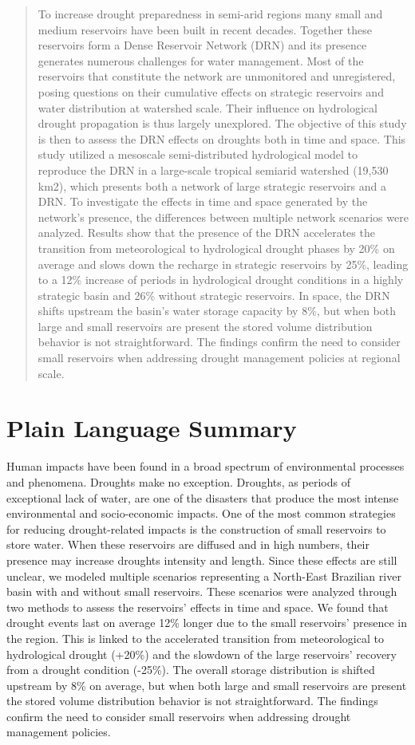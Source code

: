 \documentclass[draft]{agujournal2019}
\begin{document}
\begin{abstract}
To increase drought preparedness in semi-arid regions many small and medium reservoirs have been built in recent decades. Together these reservoirs form a Dense Reservoir Network (DRN) and its presence generates numerous challenges for water management. Most of the reservoirs that constitute the network are unmonitored and unregistered, posing questions on their cumulative effects on strategic reservoirs and water distribution at watershed scale. Their influence on hydrological drought propagation is thus largely unexplored. The objective of this study is then to assess the DRN effects on droughts both in time and space. This study utilized a mesoscale semi-distributed hydrological model to reproduce the DRN in a large-scale tropical semiarid watershed (19,530 km2), which presents both a network of large strategic reservoirs and a DRN. To investigate the effects in time and space generated by the network’s presence, the differences between multiple network scenarios were analyzed. Results show that the presence of the DRN accelerates the transition from meteorological to hydrological drought phases by 20\% on average and slows down the recharge in strategic reservoirs by 25\%, leading to a 12\% increase of periods in hydrological drought conditions in a highly strategic basin and 26\% without strategic reservoirs. In space, the DRN shifts upstream the basin’s water storage capacity by 8\%, but when both large and small reservoirs are present the stored volume distribution behavior is not straightforward. The findings confirm the need to consider small reservoirs when addressing drought management policies at regional scale.
\end{abstract}

\section*{Plain Language Summary}
Human impacts have been found in a broad spectrum of environmental processes and phenomena. Droughts make no exception. Droughts, as periods of exceptional lack of water, are one of the disasters that produce the most intense environmental and socio-economic impacts. One of the most common strategies for reducing drought-related impacts is the construction of small reservoirs to store water. When these reservoirs are diffused and in high numbers, their presence may increase droughts intensity and length. Since these effects are still unclear, we modeled multiple scenarios representing a North-East Brazilian river basin with and without small reservoirs. These scenarios were analyzed through two methods to assess the reservoirs’ effects in time and space. We found that drought events last on average 12\% longer due to the small reservoirs’ presence in the region. This is linked to the accelerated transition from meteorological to hydrological drought (+20\%) and the slowdown of the large reservoirs’ recovery from a drought condition (-25\%). The overall storage distribution is shifted upstream by 8\% on average, but when both large and small reservoirs are present the stored volume distribution behavior is not straightforward. The findings confirm the need to consider small reservoirs when addressing drought management policies.
\end{document}
